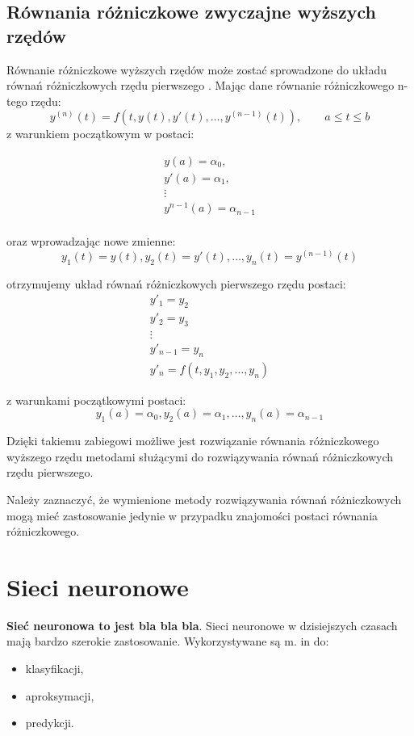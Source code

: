 \subsection*{Równania różniczkowe zwyczajne wyższych rzędów}
Równanie różniczkowe wyższych rzędów może zostać sprowadzone do układu równań różniczkowych rzędu pierwszego \cite[str. 293]{AK_RBG2002}. Mając dane równanie różniczkowego n-tego rzędu:
$$y^{(n)}(t) = f(t,y(t),y'(t),\hdots,y^{(n-1)}(t)), \qquad a \leq t \leq b$$
z warunkiem początkowym w postaci:

$$\begin{array}{c}
y(a)       = \alpha_0,    \\
y'(a)      = \alpha_1,    \\
\vdots					  \\
y^{n-1}(a) = \alpha_{n-1} \\
\end{array}$$

oraz wprowadzając nowe zmienne:
$$y_1(t) = y(t), y_2(t) = y'(t), \hdots, y_n(t) = y^{(n-1)}(t)$$

otrzymujemy układ równań różniczkowych pierwszego rzędu postaci:
$$\begin{array}{l}
y'_1       = y_2   \\
y'_2       = y_3   \\
\vdots			   \\
y'_{n-1} = y_n     \\
y'_n = f(t,y_1,y_2,\hdots,y_n)
\end{array}$$

z warunkami początkowymi postaci:
$$y_1(a) = \alpha_0, y_2(a) = \alpha_1, \hdots, y_n(a) = \alpha_{n-1}$$

Dzięki takiemu zabiegowi możliwe jest rozwiązanie równania różniczkowego wyższego rzędu metodami służącymi do rozwiązywania równań różniczkowych rzędu pierwszego.

Należy zaznaczyć, że wymienione metody rozwiązywania równań różniczkowych mogą mieć zastosowanie jedynie w przypadku znajomości postaci równania różniczkowego.
 
\newpage
\section{Sieci neuronowe} 

\textbf{Sieć neuronowa to jest bla bla bla}. Sieci neuronowe w dzisiejszych czasach mają bardzo szerokie zastosowanie. Wykorzystywane są m. in do:
\begin{itemize}
	\item klasyfikacji,
	\item aproksymacji,
	\item predykcji.
\end{itemize}
